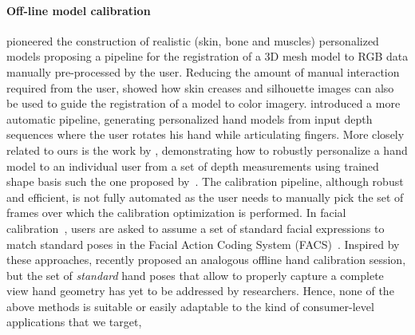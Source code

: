 \paragraph{Off-line model calibration}
\cite{albrecht2003construction} pioneered the construction of realistic (skin, bone and muscles) personalized models proposing a pipeline for the registration of a 3D mesh model to RGB data manually pre-processed by the user. Reducing the amount of manual interaction required from the user, \cite{rhee2006human} showed how skin creases and silhouette images can also be used to guide the registration of a model to color imagery. \cite{taylor2014user} introduced a more automatic pipeline, generating personalized hand models from input depth sequences where the user rotates his hand while articulating fingers. More closely related to ours is the work by \cite{tan2016fits}, demonstrating how to robustly personalize a hand model to an individual user from a set of depth measurements using trained shape basis such the one proposed by~\cite{khamis2015learning}. The calibration pipeline, although robust and efficient, is not fully automated as the user needs to manually pick the set of frames over which the calibration optimization is performed. 
In facial calibration~\cite{weise2011realtime}, users are asked to assume a set of standard facial expressions to match standard poses in the Facial Action Coding System (FACS)~\cite{}.
Inspired by these approaches, \cite{taylor2016joint} recently proposed an analogous offline hand calibration session, but the set of \emph{standard} hand poses that allow to properly capture a complete view hand geometry has yet to be addressed by researchers. Hence, none of the above methods is suitable or easily adaptable to the kind of consumer-level applications that we target,  

